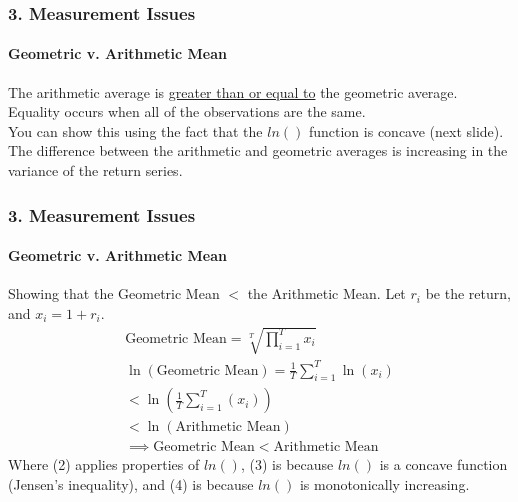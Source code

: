 \documentclass{beamer}
\begin{document}
\begin{frame}[t]
    \frametitle{3. Measurement Issues}
    \framesubtitle{Geometric v. Arithmetic Mean}

    The arithmetic average is \underline{greater than or equal to} the geometric average.  Equality occurs when all of the observations are the same.\\
    \vspace{1em}
    You can show this using the fact that the $ln()$ function is concave (next slide).\\
    
    \vspace{1em}
    The difference between the arithmetic and geometric averages is increasing in the variance of the return series.

\end{frame}

\begin{frame}[t]
    \frametitle{3. Measurement Issues}
    \framesubtitle{Geometric v. Arithmetic Mean}

    \footnotesize
    Showing that the Geometric Mean $<$ the Arithmetic Mean.  Let $r_i$ be the return, and $x_i = 1+r_i$.
    \begin{align}
        \text{Geometric Mean} = \sqrt[T]{\prod_{i=1}^{T} x_i}\\
        \ln(\text{Geometric Mean}) = \frac{1}{T} \sum_{i=1}^{T} \ln(x_i)\\
        < \ln\left(\frac{1}{T} \sum_{i=1}^{T} (x_i)\right)\\
        < \ln(\text{Arithmetic Mean})\\
        \implies \text{Geometric Mean} < \text{Arithmetic Mean}
    \end{align}
    Where (2) applies properties of $ln()$, (3) is because $ln()$ is a concave function 
    (Jensen's inequality), and (4) is because $ln()$ is monotonically increasing.

\end{frame}
\end{document}
